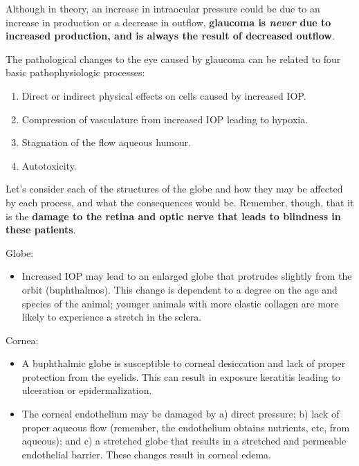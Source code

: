 \documentclass[
  openany]{article}
\providecommand{\tightlist}{%
  \setlength{\itemsep}{0pt}\setlength{\parskip}{0pt}}
\begin{document}
Although in theory, an increase in intraocular pressure could be due to an increase in production or a decrease in outflow, \textbf{glaucoma is \emph{never} due to increased production, and is always the result of decreased outflow}.

The pathological changes to the eye caused by glaucoma can be related to four basic pathophysiologic processes:

\begin{enumerate}
\def\labelenumi{\arabic{enumi}.}
\tightlist
\item
  Direct or indirect physical effects on cells caused by increased IOP.
\item
  Compression of vasculature from increased IOP leading to hypoxia.
\item
  Stagnation of the flow aqueous humour.
\item
  Autotoxicity.
\end{enumerate}

Let's consider each of the structures of the globe and how they may be affected by each process, and what the consequences would be. Remember, though, that it is the \textbf{damage to the retina and optic nerve that leads to blindness in these patients}.

Globe:

\begin{itemize}
\tightlist
\item
  Increased IOP may lead to an enlarged globe that protrudes slightly from the orbit (buphthalmos). This change is dependent to a degree on the age and species of the animal; younger animals with more elastic collagen are more likely to experience a stretch in the sclera.
\end{itemize}

Cornea:

\begin{itemize}
\tightlist
\item
  A buphthalmic globe is susceptible to corneal desiccation and lack of proper protection from the eyelids. This can result in exposure keratitis leading to ulceration or epidermalization.
\item
  The corneal endothelium may be damaged by a) direct pressure; b) lack of proper aqueous flow (remember, the endothelium obtains nutrients, etc, from aqueous); and c) a stretched globe that results in a stretched and permeable endothelial barrier. These changes result in corneal edema.
\end{itemize}
\end{document}
